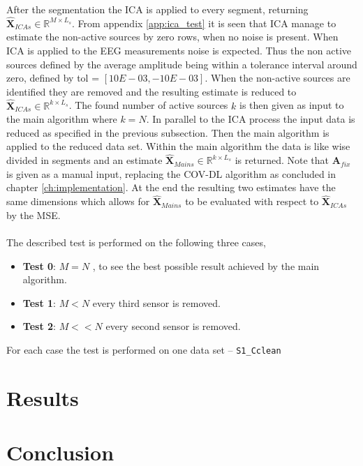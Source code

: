 After the segmentation the ICA is applied to every segment, returning $\hat{\textbf{X}}_{ICA s} \in \mathbb{R}^{M \times L_s}$.
From appendix \ref{app:ica_test} it is seen that ICA manage to estimate the non-active sources by zero rows, when no noise is present. When ICA is applied to the EEG measurements noise is expected. Thus the non active sources defined by the average amplitude being within a tolerance interval around zero, defined by tol = $[10E-03, -10E-03]$. 
When the non-active sources are identified they are removed and      
the resulting estimate is reduced to $\hat{\textbf{X}}_{ICA s} \in \mathbb{R}^{k \times L_s}$. The found number of active sources $k$ is then given as input to the main algorithm where $k = N$. 
In parallel to the ICA process the input data is reduced as specified in the previous subsection. Then the main algorithm is applied to the reduced data set. Within the main algorithm the data is like wise divided in segments and an estimate $\hat{\textbf{X}}_{Main s} \in \mathbb{R}^{k \times L_s}$ is returned. Note that $\textbf{A}_{fix}$ is given as a manual input, replacing the COV-DL algorithm as concluded in chapter \ref{ch:implementation}.
At the end the resulting two estimates have the same dimensions which allows for $\hat{\textbf{X}}_{Main s}$ to be evaluated with respect to $\hat{\textbf{X}}_{ICA s}$ by the MSE.             
% 
\\ \\
The described test is performed on the following three cases,
\begin{itemize}
\item \textbf{Test 0}: $M = N$ , to see the best possible result achieved by the main algorithm. 
\item \textbf{Test 1}: $M < N$ every third sensor is removed. 
\item \textbf{Test 2}: $M << N$ every second sensor is removed.
\end{itemize}
For each case the test is performed on one data set -- \texttt{S1\_Cclean} 

\section{Results}




\section{Conclusion}